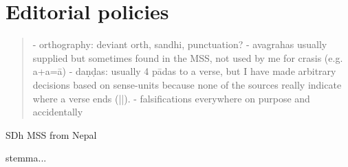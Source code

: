 \vfill
\pagebreak


\section{Editorial policies}

\begin{quote}
- orthography: deviant orth, sandhi, punctuation?
- avagrahas usually supplied but sometimes found in the MSS, not used by me for crasis (e.g. a+a=ā)
- daṇḍas: usually 4 pādas to a verse, but I have made arbitrary decisions based on sense-units 
  because none of the sources really indicate where a verse ends (||).
- falsifications everywhere on purpose and accidentally
\end{quote}

SDh MSS from Nepal

stemma...

